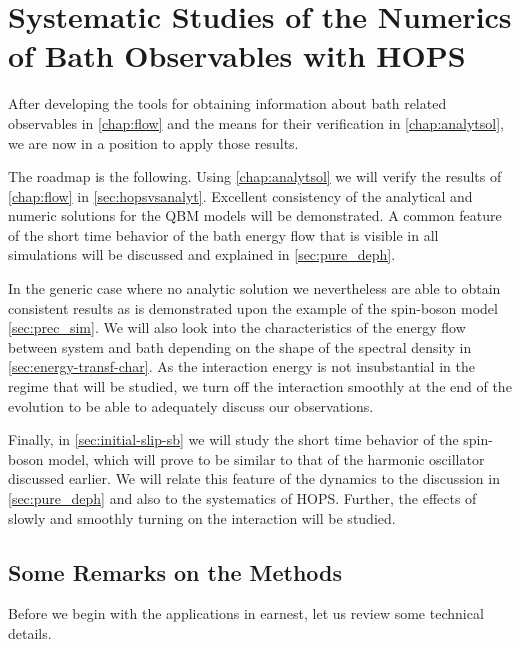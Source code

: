 \chapter{Systematic Studies of the Numerics of Bath Observables with
  HOPS}
\label{chap:numres}
After developing the tools for obtaining information about bath
related observables in \cref{chap:flow} and the means for their
verification in \cref{chap:analytsol}, we are now in a position to
apply those results.

The roadmap is the following. Using \cref{chap:analytsol} we will
verify the results of \cref{chap:flow} in
\cref{sec:hopsvsanalyt}. Excellent consistency of the analytical and
numeric solutions for the QBM models will be demonstrated.  A common
feature of the short time behavior of the bath energy flow that is
visible in all simulations will be discussed and explained in
\cref{sec:pure_deph}.

In the generic case where no analytic solution we nevertheless are
able to obtain consistent results as is demonstrated upon the example
of the spin-boson model \cref{sec:prec_sim}. We will also look into
the characteristics of the energy flow between system and bath
depending on the shape of the spectral density in
\cref{sec:energy-transf-char}. As the interaction energy is not
insubstantial in the regime that will be studied, we turn off the
interaction smoothly at the end of the evolution to be able to
adequately discuss our observations.

Finally, in \cref{sec:initial-slip-sb} we will study the short time
behavior of the spin-boson model, which will prove to be similar to
that of the harmonic oscillator discussed earlier. We will relate this
feature of the dynamics to the discussion in \cref{sec:pure_deph} and
also to the systematics of HOPS. Further, the effects of slowly and
smoothly turning on the interaction will be studied.


\section{Some Remarks on the Methods}
\label{sec:meth}
Before we begin with the applications in earnest, let us review some
technical details.

